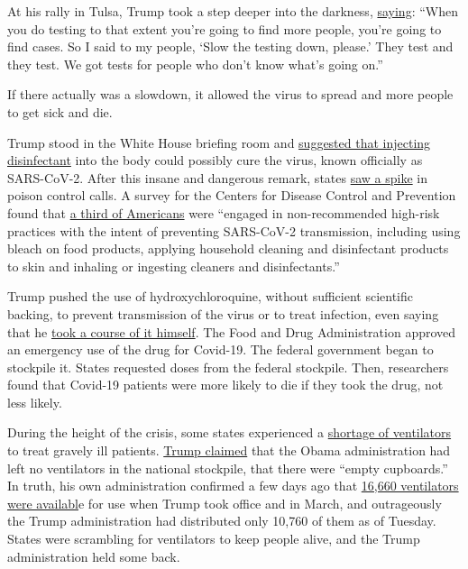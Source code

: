 At his rally in Tulsa, Trump took a step deeper into the darkness,
\href{https://www.cbsnews.com/news/trump-slow-down-testing-coronavirus-i-dont-kid/}{saying}:
``When you do testing to that extent you're going to find more people,
you're going to find cases. So I said to my people, `Slow the testing
down, please.' They test and they test. We got tests for people who
don't know what's going on.''

If there actually was a slowdown, it allowed the virus to spread and
more people to get sick and die.

Trump stood in the White House briefing room and
\href{https://www.youtube.com/watch?v=33QdTOyXz3w}{suggested that
injecting disinfectant} into the body could possibly cure the virus,
known officially as SARS-CoV-2. After this insane and dangerous remark,
states
\href{https://people.com/health/states-report-spike-in-poison-control-calls-after-trump-disinfectant-comments/}{saw
a spike} in poison control calls. A survey for the Centers for Disease
Control and Prevention found that
\href{https://www.cdc.gov/mmwr/volumes/69/wr/mm6923e2.htm?s_cid=mm6923e2_w}{a
third of Americans} were ``engaged in non-recommended high-risk
practices with the intent of preventing SARS-CoV-2 transmission,
including using bleach on food products, applying household cleaning and
disinfectant products to skin and inhaling or ingesting cleaners and
disinfectants.''

Trump pushed the use of hydroxychloroquine, without sufficient
scientific backing, to prevent transmission of the virus or to treat
infection, even saying that he
\href{https://www.nbcnews.com/politics/donald-trump/trump-says-he-s-no-longer-taking-hydroxychloroquine-n1214301}{took
a course of it himself}. The Food and Drug Administration approved an
emergency use of the drug for Covid-19. The federal government began to
stockpile it. States requested doses from the federal stockpile. Then,
researchers found that Covid-19 patients were more likely to die if they
took the drug, not less likely.

During the height of the crisis, some states experienced a
\href{https://khn.org/morning-breakout/amid-grave-shortage-of-ventilators-some-hospitals-start-sharing-between-patients-searching-for-alternatives/}{shortage
of ventilators} to treat gravely ill patients.
\href{https://www.cnn.com/2020/06/24/politics/fact-check-trump-16000-ventilators-stockpile-obama/index.html}{Trump
claimed} that the Obama administration had left no ventilators in the
national stockpile, that there were ``empty cupboards.'' In truth, his
own administration confirmed a few days ago that
\href{https://www.factcheck.org/2020/06/trump-inherited-more-ventilators-than-have-been-distributed/}{16,660
ventilators were availabl}e for use when Trump took office and in March,
and outrageously the Trump administration had distributed only 10,760 of
them as of Tuesday. States were scrambling for ventilators to keep
people alive, and the Trump administration held some back.

